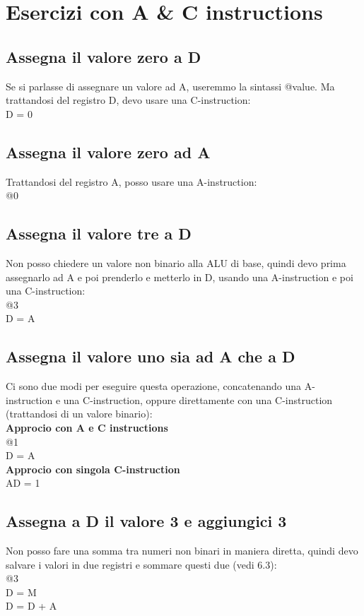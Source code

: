 \documentclass[12pt]{article}
\begin{document}
\section{Esercizi con A \& C instructions}
\subsection{Assegna il valore zero a D}
Se si parlasse di assegnare un valore ad A, useremmo la sintassi @value. Ma trattandosi del registro D, devo usare una C-instruction: \\
D = 0
\subsection{Assegna il valore zero ad A}
Trattandosi del registro A, posso usare una A-instruction: \\
@0
\subsection{Assegna il valore tre a D}
Non posso chiedere un valore non binario alla ALU di base, quindi devo prima assegnarlo ad A e poi prenderlo e metterlo in D, usando una A-instruction e poi una C-instruction: \\
@3 \\
D = A
\pagebreak
\subsection{Assegna il valore uno sia ad A che a D}
Ci sono due modi per eseguire questa operazione, concatenando una A-instruction e una C-instruction, oppure direttamente con una C-instruction (trattandosi di un valore binario): \\
\textbf{Approcio con A e C instructions} \\
@1 \\
D = A \\
\textbf{Approcio con singola C-instruction} \\
AD = 1
\subsection{Assegna a D il valore 3 e aggiungici 3}
Non posso fare una somma tra numeri non binari in maniera diretta, quindi devo salvare i valori in due registri e sommare questi due (vedi 6.3): \\%
@3 \\
D = M \\
D = D + A
\end{document}
